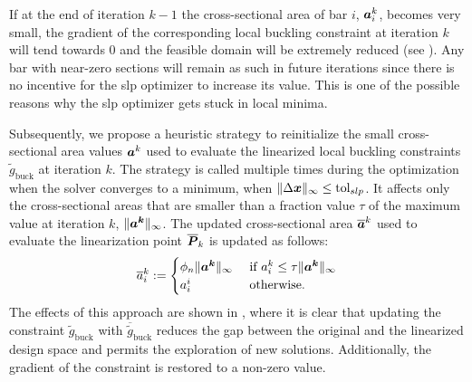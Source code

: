 If at the end of iteration $k-1$ the cross-sectional area of bar $i$, $\bm{a}^k_{i}$, becomes very small, the gradient of the corresponding local buckling constraint at iteration $k$ will tend towards 0 and the feasible domain will be extremely reduced (see ). Any bar with near-zero sections will remain as such in future iterations since there is no incentive for the \gls{slp} optimizer to increase its value. This is one of the possible reasons why the \gls{slp} optimizer gets stuck in local minima.

Subsequently, we propose a heuristic strategy to reinitialize the small cross-sectional area values $\bm{a}^{k}$ used to evaluate the linearized local buckling constraints $\tilde{g}_{\text{buck}}$ at iteration $k$. The strategy is called multiple times during the optimization when the solver converges to a minimum, \ie when $ \lVert\Delta \bm{x}\rVert_\infty \leq \text{tol}_{slp} $. It affects only the cross-sectional areas that are smaller than a fraction value $\tau$ of the maximum value at iteration $k$, $\lVert\bm{a^k}\rVert_\infty$. The updated cross-sectional area $\overline{\bm{a}}^k$ used to evaluate the linearization point $\overline{\bm{P}}_{k}$ is updated as follows:
\begin{equation}
    \overline{a}^k_{i}:=
    \begin{cases}
        \phi_n \lVert\bm{a^k}\rVert_\infty & \text{ if } a^k_{i} \leq \tau \lVert\bm{a^k}\rVert_\infty\\
        a^i_{i} & \text { otherwise.}  
    \end{cases}
    \label{eq:04_reinit}
\end{equation}
The effects of this approach are shown in , where it is clear that updating the constraint $\tilde{g}_{\text{buck}}$ with $\overline{\tilde{g}}_{\text{buck}}$ reduces the gap between the original and the linearized design space and permits the exploration of new solutions. Additionally, the gradient of the constraint is restored to a non-zero value.

